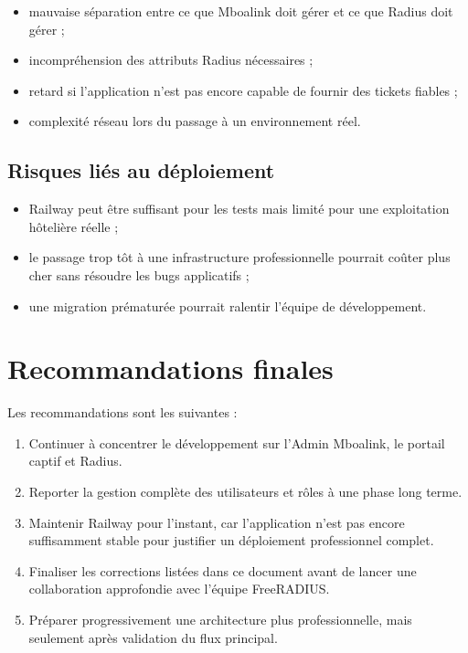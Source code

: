 \documentclass[12pt,a4paper]{article}
\begin{document}
\begin{itemize}
  \item mauvaise séparation entre ce que Mboalink doit gérer et ce que Radius doit gérer ;
  \item incompréhension des attributs Radius nécessaires ;
  \item retard si l'application n'est pas encore capable de fournir des tickets fiables ;
  \item complexité réseau lors du passage à un environnement réel.
\end{itemize}

\subsection{Risques liés au déploiement}

\begin{itemize}
  \item Railway peut être suffisant pour les tests mais limité pour une exploitation hôtelière réelle ;
  \item le passage trop tôt à une infrastructure professionnelle pourrait coûter plus cher sans résoudre les bugs applicatifs ;
  \item une migration prématurée pourrait ralentir l'équipe de développement.
\end{itemize}

\section{Recommandations finales}

Les recommandations sont les suivantes :

\begin{enumerate}
  \item Continuer à concentrer le développement sur l'Admin Mboalink, le portail captif et Radius.
  \item Reporter la gestion complète des utilisateurs et rôles à une phase long terme.
  \item Maintenir Railway pour l'instant, car l'application n'est pas encore suffisamment stable pour justifier un déploiement professionnel complet.
  \item Finaliser les corrections listées dans ce document avant de lancer une collaboration approfondie avec l'équipe FreeRADIUS.
  \item Préparer progressivement une architecture plus professionnelle, mais seulement après validation du flux principal.
\end{enumerate}
\end{document}
